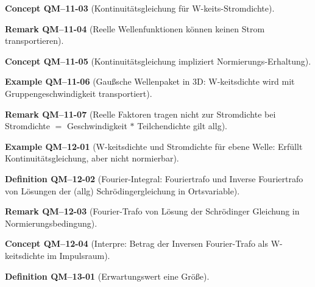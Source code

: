 \documentclass[10pt, letterpaper]{article}
\newcommand{\CustomHeading}[3]{%
  \par\medskip\noindent%
  \textbf{#1 #2} \textnormal{(#3)}.\enskip%
}
\newenvironment{DEF}[2]{\CustomHeading{Definition}{#1}{#2}}{}
\newenvironment{REM}[2]{\CustomHeading{Remark}{#1}{#2}}{}
\newenvironment{EXA}[2]{\CustomHeading{Example}{#1}{#2}}{}
\newenvironment{CONC}[2]{\CustomHeading{Concept}{#1}{#2}}{}
\begin{document}
\begin{CONC}{QM--11-03}{Kontinuitätsgleichung für W-keits-Stromdichte}
\end{CONC}

\begin{REM}{QM--11-04}{Reelle Wellenfunktionen können keinen Strom transportieren}
\end{REM}

\begin{CONC}{QM--11-05}{Kontinuitätsgleichung impliziert Normierungs-Erhaltung}
\end{CONC}

\begin{EXA}{QM--11-06}{Gaußsche Wellenpaket in 3D: W-keitsdichte wird mit Gruppengeschwindigkeit transportiert}
\end{EXA}

\begin{REM}{QM--11-07}{Reelle Faktoren tragen nicht zur Stromdichte bei 
Stromdichte $=$ Geschwindigkeit $*$ Teilchendichte gilt allg}
\end{REM}

\begin{EXA}{QM--12-01}{W-keitsdichte und Stromdichte für ebene Welle: Erfüllt Kontinuitätsgleichung, aber nicht normierbar}
\end{EXA}

\begin{DEF}{QM--12-02}{Fourier-Integral: Fouriertrafo und Inverse Fouriertrafo von Lösungen der (allg) Schrödingergleichung in Ortsvariable}
\end{DEF}

\begin{REM}{QM--12-03}{Fourier-Trafo von Lösung der Schrödinger Gleichung in Normierungsbedingung}
\end{REM}

\begin{CONC}{QM--12-04}{Interpre: Betrag der Inversen Fourier-Trafo als W-keitsdichte im Impulsraum}
\end{CONC}

\begin{DEF}{QM--13-01}{Erwartungswert eine Größe}
\end{DEF}
\end{document}
